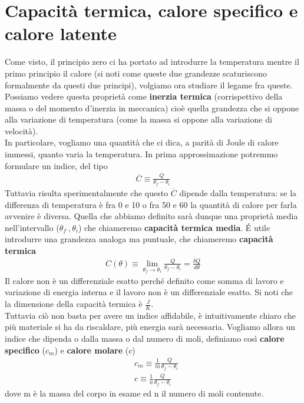 \documentclass[10pt,a4paper]{article}
\begin{document}
\section{Capacità termica, calore specifico e calore latente}
Come visto, il principio zero ci ha portato ad introdurre la temperatura mentre il primo principio il calore (si noti come queste due grandezze scaturiscono formalmente da questi due principi), volgiamo ora studiare il legame fra queste. Possiamo vedere questa proprietà come \textbf{inerzia termica} (corrispettivo della massa o del momento d'inerzia in meccanica) cioè quella grandezza che si oppone alla variazione di temperatura (come la massa si oppone alla variazione di velocità).  \\
In particolare, vogliamo una quantità che ci dica, a parità di Joule di calore immessi, quanto varia la temperatura. In prima approssimazione potremmo formulare un indice, del tipo
\begin{align*} 
	\overline{C} \equiv \frac{Q}{\theta_f - \theta_i}
\end{align*} 
Tuttavia risulta sperimentalmente che questo $\overline{C}$ dipende dalla temperatura: se la differenza di temperatura è fra 0 e 10 o fra 50 e 60 la quantità di calore per farla avvenire è diversa. Quella che abbiamo definito sarà dunque una proprietà media nell'intervallo ($\theta_f\ , \theta_i$) che chiameremo \textbf{capacità termica media}. \'{E} utile introdurre una grandezza analoga ma puntuale, che chiameremo \textbf{capacità termica}
\begin{align*} 
	C(\theta) \equiv \lim_{\theta_f \to \theta_i} \frac{Q}{\theta_f - \theta_i} = \frac{\delta Q}{d \theta}
\end{align*} 
Il calore non è un differenziale esatto perché definito come somma di lavoro e variazione di energia interna e il lavoro non è un differenziale esatto. Si noti che la dimensione della capacità termica è $\frac{J}{K}$.\\
Tuttavia ciò non basta per avere un indice affidabile, è intuitivamente chiaro che più materiale si ha da riscaldare, più energia sarà necessaria. Vogliamo allora un indice che dipenda o dalla massa o dal numero di moli, definiamo così \textbf{calore specifico} ($c_m$) e \textbf{calore molare} ($c$)
\begin{align*} 
&c_m \equiv \frac{1}{m} \frac{Q}{\theta_f - \theta_i}\\
&c \equiv \frac{1}{n} \frac{Q}{\theta_f - \theta_i}
\end{align*} 
dove m è la massa del corpo in esame ed n il numero di moli contenute.\\
\end{document}
